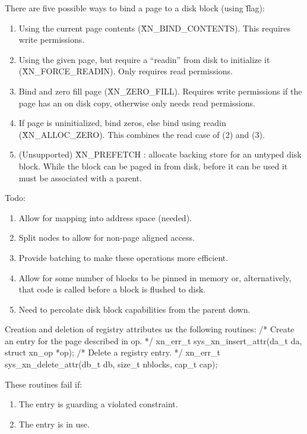 There are five possible ways to bind a page to a disk block (using \v{flag}):
\begin{enumerate}
	\item Using the current page contents
	(\v{XN\_BIND\_CONTENTS}).  This requires write permissions.

	\item Using the given page, but require a ``readin'' from disk
	to initialize it (\v{XN\_FORCE\_READIN}).  Only requires read
	permissions.

	\item Bind and zero fill page (\v{XN\_ZERO\_FILL}).  Requires
	write permissions if the page has an on disk copy, otherwise
	only needs read permissions.

	\item If page is uninitialized, bind zeros, else bind using
	readin (\v{XN\_ALLOC\_ZERO}).  This combines the read case of
	(2) and (3).

	\item (Unsupported) \v{XN\_PREFETCH} : allocate backing
	store for an untyped disk block.  While the block can
	be paged in from disk, before it can be used it must
	be associated with a parent.
\end{enumerate}

Todo:
\begin{enumerate}
	\item Allow for mapping into address space (needed).

        \item Split nodes to allow for non-page aligned access.

	\item Provide batching to make these operations more efficient.

	\item Allow for some number of blocks to be pinned in memory
	or, alternatively, that code is called before a block is
	flushed to disk.


	\item Need to percolate disk block capabilities from the parent down.
\end{enumerate}

Creation and deletion of registry attributes us the following
routines:
/* Create an entry for the page described in op. */
xn_err_t sys_xn_insert_attr(da_t da, struct xn_op *op);
/* Delete a registry entry. */
xn_err_t sys_xn_delete_attr(db_t db, size_t nblocks, cap_t cap);

These routines fail if:
\begin{enumerate}
 	\item The entry is guarding a violated constraint.
 	\item The entry is in use.
\end{enumerate}

